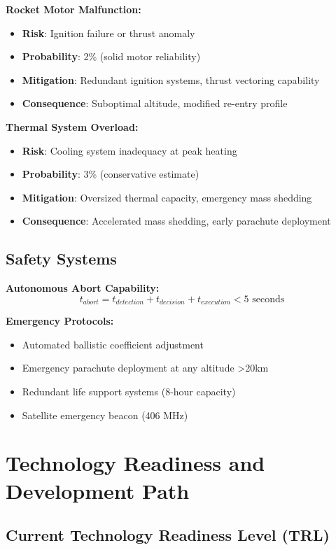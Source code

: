 \documentclass[11pt,a4paper]{article}
\begin{document}
\textbf{Rocket Motor Malfunction:}
\begin{itemize}
    \item \textbf{Risk}: Ignition failure or thrust anomaly
    \item \textbf{Probability}: 2\% (solid motor reliability)
    \item \textbf{Mitigation}: Redundant ignition systems, thrust vectoring capability
    \item \textbf{Consequence}: Suboptimal altitude, modified re-entry profile
\end{itemize}

\textbf{Thermal System Overload:}
\begin{itemize}
    \item \textbf{Risk}: Cooling system inadequacy at peak heating
    \item \textbf{Probability}: 3\% (conservative estimate)
    \item \textbf{Mitigation}: Oversized thermal capacity, emergency mass shedding
    \item \textbf{Consequence}: Accelerated mass shedding, early parachute deployment
\end{itemize}

\subsection{Safety Systems}

\textbf{Autonomous Abort Capability:}
\begin{equation}
t_{abort} = t_{detection} + t_{decision} + t_{execution} < 5 \text{ seconds}
\end{equation}

\textbf{Emergency Protocols:}
\begin{itemize}
    \item Automated ballistic coefficient adjustment
    \item Emergency parachute deployment at any altitude >20km
    \item Redundant life support systems (8-hour capacity)
    \item Satellite emergency beacon (406 MHz)
\end{itemize}

\section{Technology Readiness and Development Path}

\subsection{Current Technology Readiness Level (TRL)}
\end{document}

